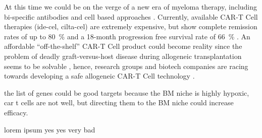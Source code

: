 At this time we could be on the verge of a new era of myeloma therapy,
including bi-specific antibodies and cell based approaches
\cite{moreNovelImmunotherapiesCombinations2023,
    engelhardtFunctionalCureLongterm2024}. Currently, available CAR-T Cell therapies
(ide-cel, cilta-cel) are extremely expensive, but show complete remission rates
of up to \SI{80}{\percent} and a 18-month progression free survival rate of
\SI{66}{\percent} \cite{bobinRecentAdvancesTreatment2022}. An affordable
``off-the-shelf'' CAR-T Cell product could become reality since the problem of
deadly graft-versus-host disease during allogeneic transplantation seems to be
solvable \cite{qasimMolecularRemissionInfant2017}, hence, research groups and
biotech companies are racing towards developing a safe allogeneic CAR-T Cell
technology \cite{depilOfftheshelfAllogeneicCAR2020}.


the list of genes could be good targets because the BM niche is highly hypoxic, car t cells
are not well, but directing them to the BM niche could increase efficacy.



%
\label{sec:discussion_conclusion_cancer}%

lorem ipsum yes yes very bad








